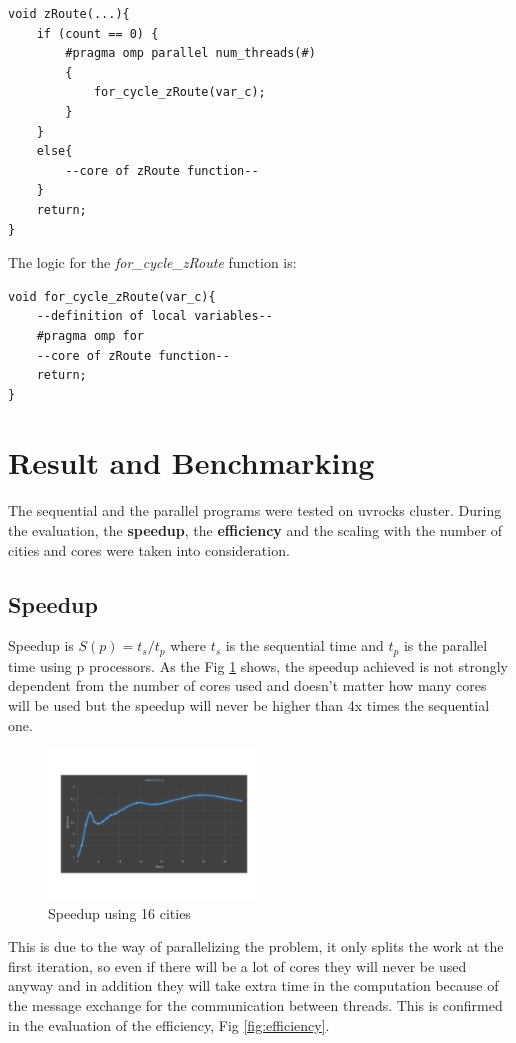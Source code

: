 \documentclass[11pt,conference]{IEEEtran}
\begin{document}
\begin{lstlisting}
void zRoute(...){
    if (count == 0) {
    	#pragma omp parallel num_threads(#)
    	{
    		for_cycle_zRoute(var_c);
    	}
    }
    else{
    	--core of zRoute function--
    }
    return;
}
\end{lstlisting}

The logic for the \textit{for\_cycle\_zRoute} function is:

\begin{lstlisting}
void for_cycle_zRoute(var_c){
    --definition of local variables--
    #pragma omp for
    --core of zRoute function--
    return;
}
\end{lstlisting}
\section{Result and Benchmarking}
The sequential and the parallel programs were tested on uvrocks cluster. During the evaluation, the \textbf{speedup}, the \textbf{efficiency} and the scaling with the number of cities and cores were taken into consideration.
\newline


\subsection{Speedup}
Speedup is $S(p) = t_s/t_p$ where $t_s$ is the sequential time and $t_p$ is the parallel time using p processors. As the Fig \ref{fig:speedup} shows, the speedup achieved is not strongly dependent from the number of cores used and doesn't matter how many cores will be used but the speedup will never be higher than 4x times the sequential one.

\begin{figure}[h!]
  \centering
    \includegraphics[trim=0.0cm 3.5cm 0.0cm 3.5cm, width=0.5\textwidth]{speedup}
    \caption{Speedup using 16 cities}
    \label{fig:speedup}
\end{figure}

This is due to the way of parallelizing the problem, it only splits the work at the first iteration, so even if there will be a lot of cores they will never be used anyway and in addition they will take extra time in the computation because of the message exchange for the communication between threads. This is confirmed in the evaluation of the efficiency, Fig \ref{fig:efficiency}.
 
\end{document}
